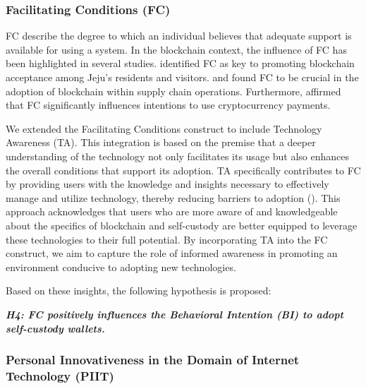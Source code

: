 \documentclass[twocolumn]{article}
\begin{document}
\subsubsection{Facilitating Conditions (FC)}
FC describe the degree to which an individual believes that adequate support is available for using a system. In the blockchain context, the influence of FC has been highlighted in several studies. \textcite{chang_acceptance_2022} identified FC as key to promoting blockchain acceptance among Jeju's residents and visitors. \textcite{queiroz_blockchain_2021} and \textcite{queiroz_blockchain_2019} found FC to be crucial in the adoption of blockchain within supply chain operations. Furthermore, \textcite{radic_you_2022} affirmed that FC significantly influences intentions to use cryptocurrency payments.

We extended the Facilitating Conditions construct to include Technology Awareness (TA). This integration is based on the premise that a deeper understanding of the technology not only facilitates its usage but also enhances the overall conditions that support its adoption. TA specifically contributes to FC by providing users with the knowledge and insights necessary to effectively manage and utilize technology, thereby reducing barriers to adoption (\cite{abubakar_moderating_2013}). This approach acknowledges that users who are more aware of and knowledgeable about the specifics of blockchain and self-custody are better equipped to leverage these technologies to their full potential. By incorporating TA into the FC construct, we aim to capture the role of informed awareness in promoting an environment conducive to adopting new technologies.

Based on these insights, the following hypothesis is proposed:

\textbf{\textit{H4: FC positively influences the Behavioral Intention (BI) to adopt self-custody wallets.}}


\subsubsection{Personal Innovativeness in the Domain of Internet Technology (PIIT)}
\end{document}
